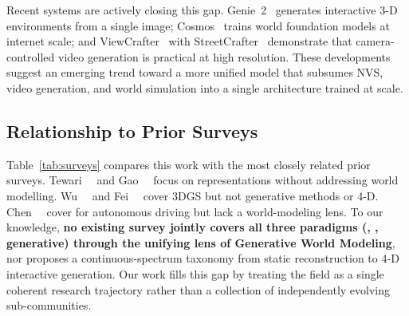 Recent systems are actively closing this gap.
Genie~2~\citep{parkerholder2024genie2} generates interactive 3-D environments
from a single image; Cosmos~\citep{agarwal2025cosmos} trains world foundation
models at internet scale; and ViewCrafter~\citep{yu2024viewcrafter} with
StreetCrafter~\citep{yan2024streetcrafter} demonstrate that camera-controlled
video generation is practical at high resolution.
These developments suggest an emerging trend toward a more unified model that
subsumes NVS, video generation, and world simulation into a single
architecture trained at scale.

\subsection{Relationship to Prior Surveys}

Table~\ref{tab:surveys} compares this work with the most closely related
prior surveys.
Tewari~\etal~\citep{tewari2022advances} and
Gao~\etal~\citep{gao2022nerf_survey} focus on \nerf{} representations
without addressing world modelling.
Wu~\etal~\citep{wu2024recentGS} and
Fei~\etal~\citep{fei2024gssurvey} cover 3DGS but not generative methods or 4-D.
Chen~\etal~\citep{chen2024survey_drivingNVS} cover \nvs{} for autonomous driving
but lack a world-modeling lens.
To our knowledge, \textbf{no existing survey jointly covers all three paradigms
(\nerf{}, \tgs{}, generative) through the unifying lens of Generative World
Modeling}, nor proposes a continuous-spectrum taxonomy from static
reconstruction to 4-D interactive generation.
Our work fills this gap by treating the field as a single coherent research
trajectory rather than a collection of independently evolving sub-communities.

